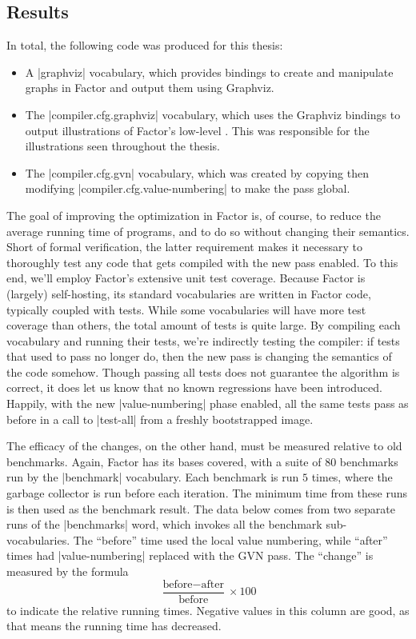 \subsection{Results}\label{sec:vn:results}


In total, the following code was produced for this thesis:
\begin{itemize}
  \item A \factor|graphviz| vocabulary, which provides bindings to create and
        manipulate graphs in Factor and output them using Graphviz.
  \item The \factor|compiler.cfg.graphviz| vocabulary, which uses the Graphviz
        bindings to output illustrations of Factor's low-level .
        This was responsible for the illustrations seen throughout the thesis.
  \item The \factor|compiler.cfg.gvn| vocabulary, which was created by copying
        then modifying \factor|compiler.cfg.value-numbering| to make the pass
        global.
\end{itemize}

The goal of improving the optimization in Factor is, of course, to reduce the
average running time of programs, and to do so without changing their
semantics.  Short of formal verification, the latter requirement makes it
necessary to thoroughly test any code that gets compiled with the new pass
enabled.  To this end, we'll employ Factor's extensive unit test coverage.
Because Factor is (largely) self-hosting, its standard vocabularies are written
in Factor code, typically coupled with tests.  While some vocabularies will
have more test coverage than others, the total amount of tests is quite large.
By compiling each vocabulary and running their tests, we're indirectly testing
the compiler: if tests that used to pass no longer do, then the new pass is
changing the semantics of the code somehow.  Though passing all tests does not
guarantee the algorithm is correct, it does let us know that no known
regressions have been introduced.  Happily, with the new
\factor|value-numbering| phase enabled, all the same tests pass as before in a
call to \factor|test-all| from a freshly bootstrapped image.

The efficacy of the changes, on the other hand, must be measured relative to
old benchmarks.  Again, Factor has its bases covered, with a suite of $80$
benchmarks run by the \factor|benchmark| vocabulary.  Each benchmark is run $5$
times, where the garbage collector is run before each iteration.  The minimum
time from these runs is then used as the benchmark result.  The data below
comes from two separate runs of the \factor|benchmarks| word, which invokes all
the benchmark sub-vocabularies.  The ``before'' time used the local value
numbering, while ``after'' times had \factor|value-numbering| replaced with the
\gls{GVN} pass.  The ``change'' is measured by the formula
%
$$\frac{\text{before} - \text{after}}{\text{before}} \times 100$$
%
to indicate the relative running times.  Negative values in this column are
good, as that means the running time has decreased.

